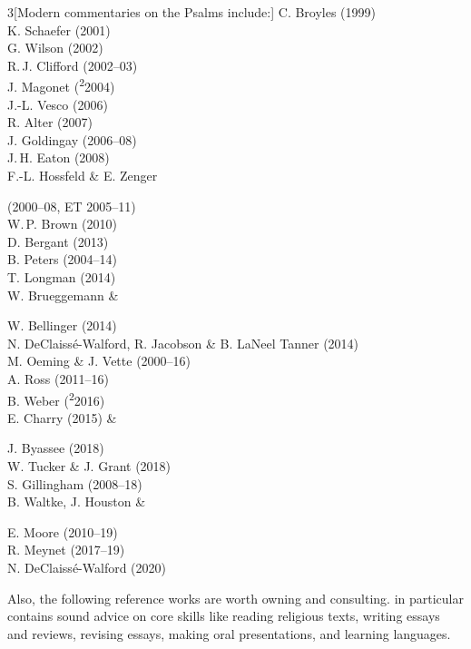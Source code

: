 \documentclass[titlepage]{article}
\begin{document}
\begin{multicols}{3}[Modern commentaries on the Psalms include:]
C. Broyles (1999)\\
K. Schaefer (2001)\\
G. Wilson (2002)\\
R.\,J. Clifford (2002--03)\\
J. Magonet (\textsuperscript{2}2004)\\
J.-L. Vesco (2006)\\
R. Alter (2007)\\
J. Goldingay (2006--08)\\
J.\,H. Eaton (2008)\\
F.-L. Hossfeld \& E. Zenger\par (2000--08, ET 2005--11)\\
W.\,P. Brown (2010)\\
D. Bergant (2013)\\
B. Peters (2004--14)\\
T. Longman (2014)\\
W. Brueggemann \&\par W. Bellinger (2014)\\
N. DeClaissé-Walford, R. Jacobson \& B. LaNeel Tanner (2014)\\
M. Oeming \& J. Vette (2000--16)\\
A. Ross (2011--16)\\
B. Weber (\textsuperscript{2}2016)\\
E. Charry (2015) \&\par J. Byassee (2018)\\
W. Tucker \& J. Grant (2018)\\
S. Gillingham (2008--18)\\
B. Waltke, J. Houston \&\par E. Moore (2010--19)\\
R. Meynet (2017--19)\\
N. DeClaissé-Walford (2020)
\end{multicols}

Also, the following reference works are worth owning and consulting.
\cite{rlgs} in particular contains sound advice on core skills like
reading religious texts, writing essays and reviews, revising essays,
making oral presentations, and learning languages.
\end{document}
